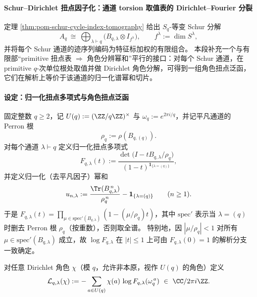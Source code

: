 
\paragraph{Schur--Dirichlet 扭点因子化：通道 torsion 取值表的 Dirichlet--Fourier 分裂}\label{subsubsec:pom-schur-dirichlet-torsion-factorization}
定理 \ref{thm:pom-schur-cycle-index-tomography} 给出 \(S_q\)-等变 Schur 分解
\[
A_q\ \cong\ \bigoplus_{\lambda\vdash q}\bigl(B_{q,\lambda}\otimes I_{f^\lambda}\bigr),
\qquad f^\lambda:=\dim S^\lambda,
\]
并将每个 Schur 通道的迹序列编码为特征标加权的有限组合。
本段补充一个与有限部“primitive 扭点表 \(\Rightarrow\) 角色分辨幂和”平行的接口：对每个 Schur 通道，在 primitive \(q\)-次单位根处取值并做 Dirichlet 角色分解，可得到一组角色扭点泛函，它们在解析上等价于该通道的归一化谱幂和切片。

\paragraph{设定：归一化扭点多项式与角色扭点泛函}
固定整数 \(q\ge2\)，记 \(U(q):=(\ZZ/q\ZZ)^\times\) 与 \(\omega_q:=e^{2\pi i/q}\)，并记平凡通道的 Perron 根
\[
\rho_q:=\rho(B_{q,(q)}).
\]
对每个通道 \(\lambda\vdash q\) 定义归一化扭点多项式
\[
F_{q,\lambda}(t)
:=
\frac{\det\!\bigl(I-tB_{q,\lambda}/\rho_q\bigr)}
{(1-t)^{\mathbf 1_{\{\lambda=(q)\}}}},
\]
并定义归一化（去平凡因子）幂和
\[
u_{n,\lambda}
:=
\frac{\Tr(B_{q,\lambda}^{\,n})}{\rho_q^{\,n}}
-\mathbf 1_{\{\lambda=(q)\}}
\qquad(n\ge1).
\]
于是 \(F_{q,\lambda}(t)=\prod_{\mu\in\mathrm{spec}'(B_{q,\lambda})}(1-(\mu/\rho_q)t)\)，其中 \(\mathrm{spec}'\) 表示当 \(\lambda=(q)\) 时删去 Perron 根 \(\rho_q\)（按重数），否则取全谱。
特别地，因 \(|\mu/\rho_q|<1\) 对所有 \(\mu\in\mathrm{spec}'(B_{q,\lambda})\) 成立，故 \(\log F_{q,\lambda}\) 在 \(|t|\le1\) 上可由 \(F_{q,\lambda}(0)=1\) 的解析分支一致确定。

\begin{definition}\label{def:pom-schur-dirichlet-torsion-functional}
对任意 Dirichlet 角色 \(\chi\)（模 \(q\)，允许非本原，视作 \(U(q)\) 的角色）定义
\[
\mathcal{L}_{q,\lambda}(\chi)
:=
-\sum_{a\in U(q)}\chi(a)\,\log F_{q,\lambda}(\omega_q^{\,a})
\ \in\ \CC/2\pi i\ZZ.
\]
\end{definition}

